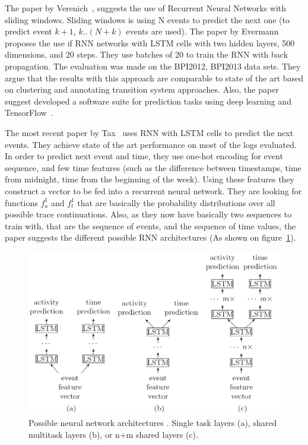 The paper by Verenich~\cite{quteprints96732}, suggests the use of Recurrent Neural Networks with sliding windows. Sliding windows is using N events to predict the next one (to predict event $k+1$,  $k..(N+k)$ events are used). The paper by Evermann\cite{evermann} proposes the use if RNN networks with LSTM cells with two hidden layers, 500 dimensions, and 20 steps. They use batches of 20 to train the RNN with back propagation. The evaluation was made on the BPI2012, BPI2013 data sets. They argue that the results with this approach are comparable to state of the art based on clustering and annotating transition system approaches. Also, the paper~\cite{evermann2} suggest developed a software suite for prediction tasks using deep learning and TensorFlow~\cite{tensorflow2015-whitepaper}.

The most recent paper by Tax~\cite{niek96732} uses RNN with LSTM cells to predict the next events. They achieve state of the art performance on most of the logs evaluated. In order to predict next event and time, they use one-hot encoding for event sequence, and few time features (such as the difference between timestamps, time from midnight, time from the beginning of the week). Using these features they construct a vector to be fed into a recurrent neural network. They are looking for functions $f_a^1$ and $f_t^1$ that are basically the probability distributions over all possible trace continuations. Also, as they now have basically two sequences to train with, that are the sequence of events, and the sequence of time values, the paper suggests the different possible RNN architectures (As shown on figure~\ref{figure:architectureslstm}). 

\begin{figure}[!ht]
	\begin{center}  
		\includegraphics[width=\textwidth]{1.png}
		\caption{Possible neural network architectures \cite{niek96732}. Single task layers (a), shared multitask layers (b), or n+m shared layers (c).}
		\label{figure:architectureslstm}	
	\end{center}
\end{figure}


